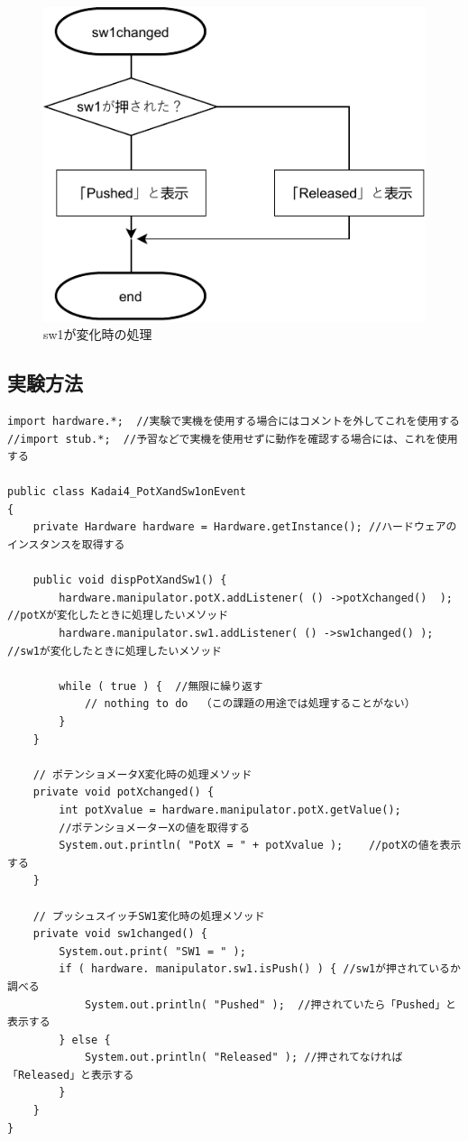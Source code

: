 \documentclass{jarticle}
\begin{document}
\begin{figure}[H]
    \centering
    \includegraphics{kumikomi4se1changed.pdf}
    \caption{sw1が変化時の処理}
    \label{fig:my_label}
\end{figure}


\subsection{実験方法}

\begin{lstlisting}[caption=PotXandSw1]
import hardware.*;  //実験で実機を使用する場合にはコメントを外してこれを使用する
//import stub.*;  //予習などで実機を使用せずに動作を確認する場合には、これを使用する

public class Kadai4_PotXandSw1onEvent
{
    private Hardware hardware = Hardware.getInstance(); //ハードウェアのインスタンスを取得する

    public void dispPotXandSw1() {
        hardware.manipulator.potX.addListener( () ->potXchanged()  );  //potXが変化したときに処理したいメソッド
        hardware.manipulator.sw1.addListener( () ->sw1changed() );  //sw1が変化したときに処理したいメソッド

        while ( true ) {  //無限に繰り返す
            // nothing to do  （この課題の用途では処理することがない）
        }
    }

    // ポテンショメータX変化時の処理メソッド
    private void potXchanged() {
        int potXvalue = hardware.manipulator.potX.getValue();   
        //ポテンショメーターXの値を取得する
        System.out.println( "PotX = " + potXvalue );    //potXの値を表示する
    }

    // プッシュスイッチSW1変化時の処理メソッド
    private void sw1changed() {
        System.out.print( "SW1 = " );
        if ( hardware. manipulator.sw1.isPush() ) { //sw1が押されているか調べる
            System.out.println( "Pushed" );  //押されていたら「Pushed」と表示する
        } else {
            System.out.println( "Released" ); //押されてなければ「Released」と表示する
        }
    } 
}
\end{lstlisting}
\end{document}
